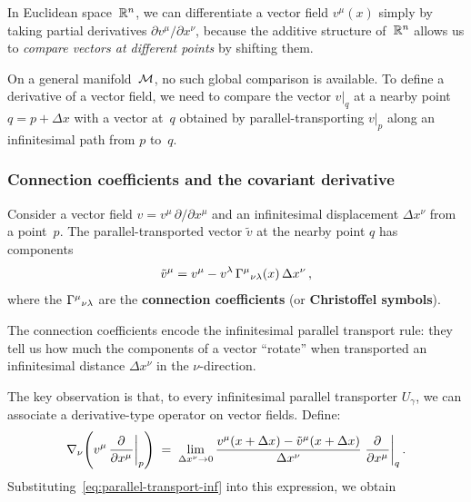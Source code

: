 In Euclidean space~$\mathbb{R}^{n}$, we can differentiate a vector field
$v^\mu(x)$ simply by taking partial derivatives
$\partial v^\mu/\partial x^\nu$, because the additive structure
of~$\mathbb{R}^{n}$ allows us to \emph{compare vectors at different
points} by shifting them.

On a general manifold~$\mathcal{M}$, no such global comparison is
available.  To define a derivative of a vector field, we need to
compare the vector $v|_{q}$ at a nearby point $q = p + \Delta x$
with a vector at~$q$ obtained by parallel-transporting $v|_p$
along an infinitesimal path from $p$ to~$q$.

\subsubsection{Connection coefficients and the covariant
derivative}\label{sec:connection-coefficients}

Consider a vector field $v = v^\mu\,\partial/\partial x^\mu$ and
an infinitesimal displacement $\Delta x^\nu$ from a point~$p$.
The parallel-transported vector $\tilde{v}$ at the nearby point
$q$ has components
\begin{equation}\label{eq:parallel-transport-inf}
  \tilde{v}^\mu
  = v^\mu - v^\lambda\,\Gamma^{\mu}{}_{\nu\lambda}(x)\,\Delta x^\nu\,,
\end{equation}
where the $\Gamma^{\mu}{}_{\nu\lambda}$ are the \textbf{connection
coefficients} (or \textbf{Christoffel symbols}).

\begin{remark}
  The connection coefficients encode the infinitesimal parallel
  transport rule: they tell us how much the components of a
  vector ``rotate'' when transported an infinitesimal distance
  $\Delta x^\nu$ in the $\nu$-direction.
\end{remark}

\noindent
The key observation is that, to every infinitesimal parallel
transporter $U_\gamma$, we can associate a derivative-type
operator on vector fields.  Define:
\begin{equation}\label{eq:covd-heuristic}
  \covd_\nu\!\left(v^\mu\,\pd{}{x^\mu}\bigg|_p\right)
  \;=\;
  \lim_{\Delta x^\nu\to 0}
    \frac{v^\mu(x+\Delta x) - \tilde{v}^\mu(x+\Delta x)}%
         {\Delta x^\nu}\;
    \pd{}{x^\mu}\bigg|_q\,.
\end{equation}
Substituting~\eqref{eq:parallel-transport-inf} into this
expression, we obtain

